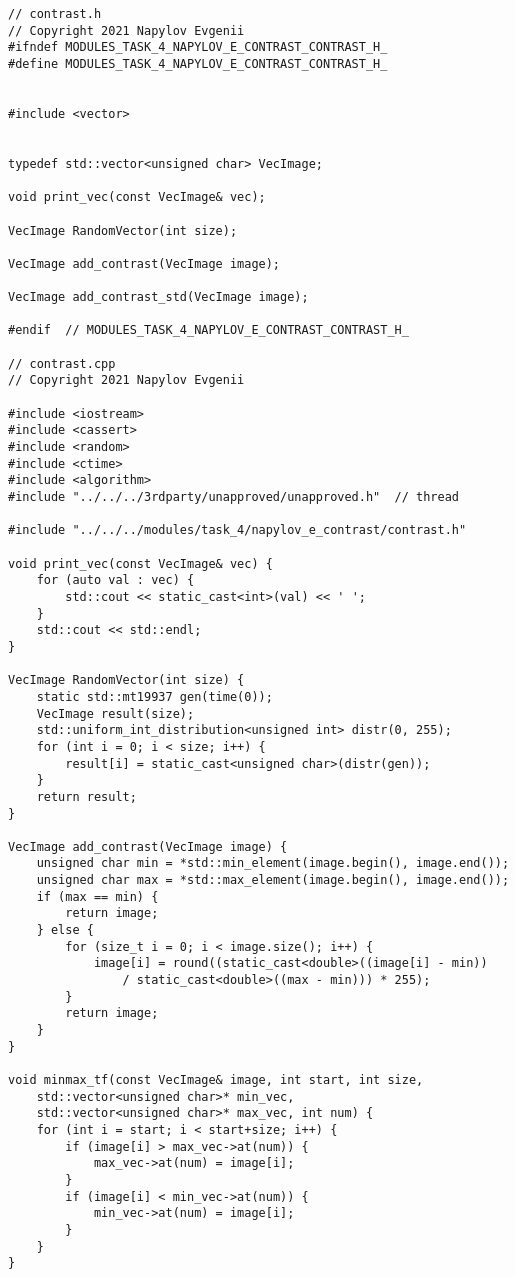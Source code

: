 \documentclass{report}
\begin{document}
    \begin{lstlisting}
// contrast.h
// Copyright 2021 Napylov Evgenii
#ifndef MODULES_TASK_4_NAPYLOV_E_CONTRAST_CONTRAST_H_
#define MODULES_TASK_4_NAPYLOV_E_CONTRAST_CONTRAST_H_


#include <vector>


typedef std::vector<unsigned char> VecImage;

void print_vec(const VecImage& vec);

VecImage RandomVector(int size);

VecImage add_contrast(VecImage image);

VecImage add_contrast_std(VecImage image);

#endif  // MODULES_TASK_4_NAPYLOV_E_CONTRAST_CONTRAST_H_

// contrast.cpp
// Copyright 2021 Napylov Evgenii

#include <iostream>
#include <cassert>
#include <random>
#include <ctime>
#include <algorithm>
#include "../../../3rdparty/unapproved/unapproved.h"  // thread

#include "../../../modules/task_4/napylov_e_contrast/contrast.h"

void print_vec(const VecImage& vec) {
    for (auto val : vec) {
        std::cout << static_cast<int>(val) << ' ';
    }
    std::cout << std::endl;
}

VecImage RandomVector(int size) {
    static std::mt19937 gen(time(0));
    VecImage result(size);
    std::uniform_int_distribution<unsigned int> distr(0, 255);
    for (int i = 0; i < size; i++) {
        result[i] = static_cast<unsigned char>(distr(gen));
    }
    return result;
}

VecImage add_contrast(VecImage image) {
    unsigned char min = *std::min_element(image.begin(), image.end());
    unsigned char max = *std::max_element(image.begin(), image.end());
    if (max == min) {
        return image;
    } else {
        for (size_t i = 0; i < image.size(); i++) {
            image[i] = round((static_cast<double>((image[i] - min))
                / static_cast<double>((max - min))) * 255);
        }
        return image;
    }
}

void minmax_tf(const VecImage& image, int start, int size,
    std::vector<unsigned char>* min_vec,
    std::vector<unsigned char>* max_vec, int num) {
    for (int i = start; i < start+size; i++) {
        if (image[i] > max_vec->at(num)) {
            max_vec->at(num) = image[i];
        }
        if (image[i] < min_vec->at(num)) {
            min_vec->at(num) = image[i];
        }
    }
}


\end{lstlisting}
\end{document}
